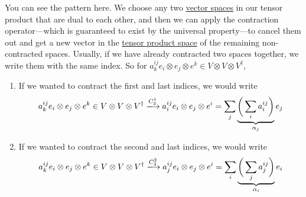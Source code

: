 	You can see the pattern here. We choose any two \hyperref[def:vector-space]{vector spaces} in our tensor product that are dual to each other, and then we can apply the contraction operator---which is guaranteed to exist by the universal property---to cancel them out and get a new vector in the \hyperref[def:tensor]{tensor product space} of the remaining non-contracted spaces. Usually, if we have already contracted two spaces together, we write them with the same index. So for $a^{ij}_k e_i \otimes e_j \otimes e^k \in V \otimes V \otimes V^\dagger$, 
	\begin{enumerate}
	  \item If we wanted to contract the first and last indices, we would write 
			\begin{equation}
				a^{ij}_k e_i \otimes e_j \otimes e^k \in V \otimes V \otimes V^\dagger \xlongrightarrow{C^1_3} a^{ij}_i e_i \otimes e_j \otimes e^i = \sum_j \underbrace{\bigg( \sum_i a^{ij}_i \bigg)}_{\alpha_j} e_j
			\end{equation}

		\item If we wanted to contract the second and last indices, we would write 
			\begin{equation}
				a^{ij}_k e_i \otimes e_j \otimes e^k \in V \otimes V \otimes V^\dagger \xlongrightarrow{C^2_3} a^{ij}_j e_i \otimes e_j \otimes e^i = \sum_{i} \underbrace{\bigg(\sum_j a^{ij}_j \bigg)}_{\alpha_i} e_i
			\end{equation}
	\end{enumerate}
	
